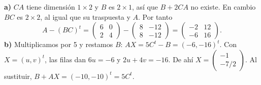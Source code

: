 \textbf{a)} $CA$ tiene dimensión $1\times2$ y $B$ es $2\times1$,
así que $B+2CA$ no existe. En cambio $BC$ es $2\times2$,
al igual que su traspuesta y $A$. Por tanto
\[
A-(BC)^t=
\begin{pmatrix}6&0\\2&4\end{pmatrix}
-\begin{pmatrix}8&-12\\8&-12\end{pmatrix}
=\boxed{\begin{pmatrix}-2&12\\-6&16\end{pmatrix}}.
\]
\textbf{b)} Multiplicamos por 5 y restamos $B$:
$AX=5C^t-B=(-6,-16)^t$. Con $X=(u,v)^t$, las filas dan
$6u=-6$ y $2u+4v=-16$. De ahí
$\boxed{X=\begin{pmatrix}-1\\-7/2\end{pmatrix}}$.
Al sustituir, $B+AX=(-10,-10)^t=5C^t$.
